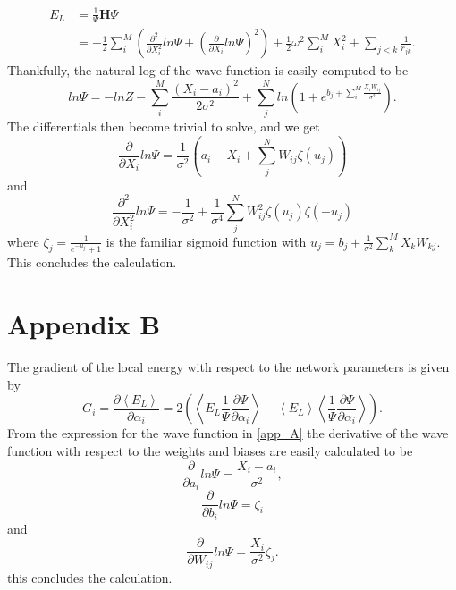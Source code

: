 \documentclass[11pt,a4paper,titlepage]{article}
\begin{document}
\begin{equation}\label{eq:local_energy_derived}
\begin{aligned}
E_{L} &=\frac{1}{\Psi} \mathbf{H} \Psi \\
&=-\frac{1}{2} \sum_{i}^{M} \left( \frac{\partial^2}{\partial X_i^2} ln\Psi +  \left( \frac{\partial}{\partial X_i} ln\Psi \right)^2 \right)+\frac{1}{2} \omega^{2} \sum_{i}^{M} X_{i}^{2}+\sum_{j<k} \frac{1}{r_{j k}}.
\end{aligned}
\end{equation}
Thankfully, the natural log of the wave function is easily computed to be
$$
ln\Psi = -ln Z-\sum_{i}^{M} \frac{\left(X_{i}-a_{i}\right)^{2}}{2 \sigma^{2}}+\sum_{j}^{N} ln \left(1+e^{b_{j}+\sum_{i}^{M} \frac{X_{i} W_{i j}}{\sigma^{2}}}\right).
$$
The differentials then become trivial to solve, and we get
$$
\frac{\partial}{\partial X_i} ln \Psi=\frac{1}{\sigma^{2}}\left(a_i-X_i+\sum_{j}^{N} W_{ij}\zeta(u_j) \right)
$$
and
$$
\frac{\partial^{2}}{\partial X_{i}^{2}} ln \Psi=-\frac{1}{\sigma^{2}}+\frac{1}{\sigma^{4}} \sum_{j}^{N} W_{i j}^{2} \zeta(u_j) \zeta(-u_j) 
$$
where $\zeta_j = \frac{1}{e^{-u_j}+1}$ is the familiar sigmoid function with $u_j = b_{j}+\frac{1}{\sigma^{2}} \sum_{k}^{M} X_k W_{k j}$. This concludes the calculation.
\section{Appendix B}\label{app_B}
The gradient of the local energy with respect to the network parameters is given by
\begin{equation}\label{eq:lE_gradient}
G_{i}=\frac{\partial\left\langle E_{L}\right\rangle}{\partial \alpha_{i}}=2\left(\left\langle E_{L} \frac{1}{\Psi} \frac{\partial \Psi}{\partial \alpha_{i}}\right\rangle-\left\langle E_{L}\right\rangle\left\langle\frac{1}{\Psi} \frac{\partial \Psi}{\partial \alpha_{i}}\right\rangle\right).
\end{equation}
From the expression for the wave function in \ref{app_A} the derivative of the wave function with respect to the weights and biases are easily calculated to be
$$
\frac{\partial}{\partial a_{i}} ln \Psi =\frac{X_{i}-a_{i}}{\sigma^{2}},
$$
$$
\frac{\partial}{\partial b_{i}} ln \Psi = \zeta_i
$$
and
$$
\frac{\partial}{\partial W_{i j}} ln \Psi =\frac{X_{i}}{\sigma^{2}}\zeta_j.
$$
this concludes the calculation.


\end{document}
